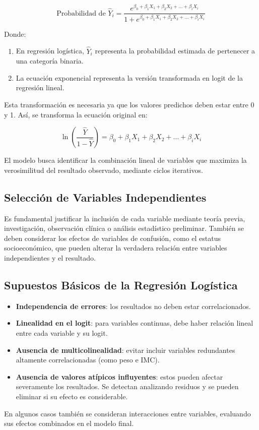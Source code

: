 \[
\text{Probabilidad de } \hat{Y}_i = \frac{e^{\beta_0 + \beta_1 X_1 + \beta_2 X_2 + \ldots + \beta_i X_i}}{1 + e^{\beta_0 + \beta_1 X_1 + \beta_2 X_2 + \ldots + \beta_i X_i}}
\]

Donde:

\begin{enumerate}
  \item En regresión logística, $\hat{Y}_i$ representa la probabilidad estimada de pertenecer a una categoría binaria.
  \item La ecuación exponencial representa la versión transformada en logit de la regresión lineal.
\end{enumerate}

Esta transformación es necesaria ya que los valores predichos deben estar entre 0 y 1. Así, se transforma la ecuación original en:

\[
\ln \left( \frac{\hat{Y}}{1 - \hat{Y}} \right) = \beta_0 + \beta_1 X_1 + \beta_2 X_2 + \ldots + \beta_i X_i
\]

El modelo busca identificar la combinación lineal de variables que maximiza la verosimilitud del resultado observado, mediante ciclos iterativos.

\subsection{Selección de Variables Independientes}

Es fundamental justificar la inclusión de cada variable mediante teoría previa, investigación, observación clínica o análisis estadístico preliminar. También se deben considerar los efectos de variables de confusión, como el estatus socioeconómico, que pueden alterar la verdadera relación entre variables independientes y el resultado.

\subsection{Supuestos Básicos de la Regresión Logística}

\begin{itemize}
  \item \textbf{Independencia de errores}: los resultados no deben estar correlacionados.
  \item \textbf{Linealidad en el logit}: para variables continuas, debe haber relación lineal entre cada variable y su logit.
  \item \textbf{Ausencia de multicolinealidad}: evitar incluir variables redundantes altamente correlacionadas (como peso e IMC).
  \item \textbf{Ausencia de valores atípicos influyentes}: estos pueden afectar severamente los resultados. Se detectan analizando residuos y se pueden eliminar si su efecto es considerable.
\end{itemize}

En algunos casos también se consideran interacciones entre variables, evaluando sus efectos combinados en el modelo final.
